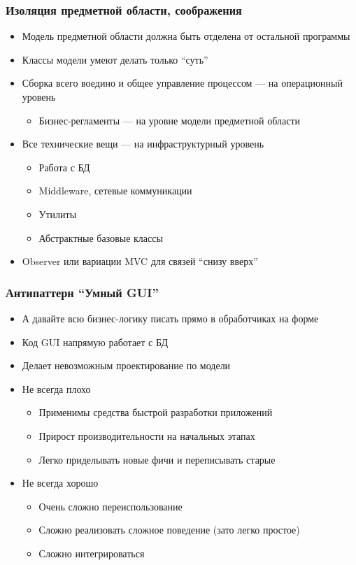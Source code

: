 \documentclass{../../slides-style}
\begin{document}
	\begin{frame}
		\frametitle{Изоляция предметной области, соображения}
		\begin{itemize}
			\item Модель предметной области должна быть отделена от остальной программы
			\item Классы модели умеют делать только ``суть''
			\item Сборка всего воедино и общее управление процессом --- на операционный уровень
			\begin{itemize}
				\item Бизнес-регламенты --- на уровне модели предметной области
			\end{itemize}
			\item Все технические вещи --- на инфраструктурный уровень
			\begin{itemize}
				\item Работа с БД
				\item Middleware, сетевые коммуникации
				\item Утилиты
				\item Абстрактные базовые классы
			\end{itemize}
			\item Observer или вариации MVC для связей ``снизу вверх''
		\end{itemize}
	\end{frame}

	\begin{frame}
		\frametitle{Антипаттерн ``Умный GUI''}
		\begin{itemize}
			\item А давайте всю бизнес-логику писать прямо в обработчиках на форме
			\item Код GUI напрямую работает с БД
			\item Делает невозможным проектирование по модели
			\item Не всегда плохо
			\begin{itemize}
				\item Применимы средства быстрой разработки приложений
				\item Прирост производительности на начальных этапах
				\item Легко приделывать новые фичи и переписывать старые
			\end{itemize}
			\item Не всегда хорошо
			\begin{itemize}
				\item Очень сложно переиспользование
				\item Сложно реализовать сложное поведение (зато легко простое)
				\item Сложно интегрироваться
			\end{itemize}
		\end{itemize}
	\end{frame}
\end{document}
